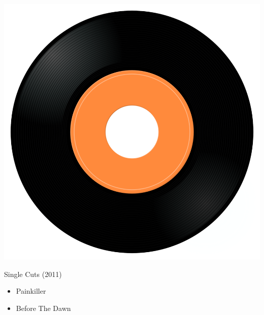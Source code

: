 \begin{minipage}[t]{0.25\textwidth}\vspace{0pt}
\captionsetup{type=figure}
\includegraphics[width=\textwidth]{Images/cover.png}
\caption*{Single Cuts (2011)}
\end{minipage}
\begin{minipage}[t]{0.25\textwidth}\vspace{0pt}
\begin{itemize}[nosep,leftmargin=1em,labelwidth=*,align=left]
	\setlength{\itemsep}{0pt}
	\item Painkiller
	\item Before The Dawn
\end{itemize}
\end{minipage}
